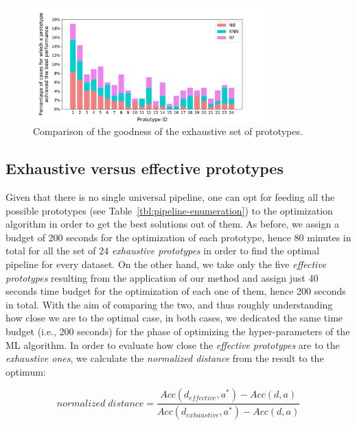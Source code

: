 \begin{figure}[t]
    \centering
    \includegraphics[width=0.8\textwidth]{chapters/data-centric/supervised/img/evaluation1.pdf}
    \caption{Comparison of the goodness of the exhaustive set of prototypes.}
    \label{fig:eval-universal-pipeline}
\end{figure}

\subsection{Exhaustive versus effective prototypes}
\label{sec:eval-our-vs-rest}
Given that there is no single universal pipeline, one can opt for feeding all the possible prototypes (see Table~\ref{tbl:pipeline-enumeration}) to the optimization algorithm in order to get the best solutions out of them. 
As before, we assign a budget of 200 seconds for the optimization of each prototype, hence 80 minutes in total for all the set of 24 \textit{exhaustive prototypes} in order to find the optimal pipeline for every dataset. On the other hand, we take only the five \textit{effective prototypes} resulting from the application of our method and assign just 40 seconds time budget for the optimization of each one of them, hence 200 seconds in total. With the aim of comparing the two, and thus roughly understanding how close we are to the optimal case, in both cases, we dedicated the same time budget (i.e., 200 seconds) for the phase of optimizing the hyper-parameters of the ML algorithm.
In order to evaluate how close the \textit{effective prototypes} are to the \textit{exhaustive ones}, we calculate the \textit{normalized distance} from the result to the optimum:

\begin{equation*}
    normalized\;distance = \frac{Acc(d_{e\!f\!f\!ective},a^*) - Acc(d,a)}{Acc(d_{exhaustive},a^*) - Acc(d,a)}
\end{equation*}

